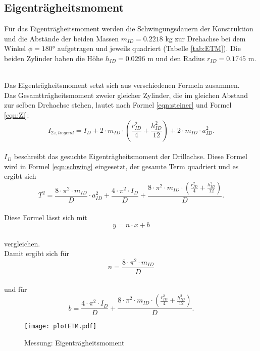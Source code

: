 \subsection{Eigenträgheitsmoment}
Für das Eigenträgheitsmoment werden die Schwingungsdauern der Konstruktion und die Abstände der beiden Massen $m_{ID}=0.2218$ kg zur Drehachse bei dem Winkel $\phi = 180°$ aufgetragen und jeweils quadriert (Tabelle \ref{tab:ETM}).
Die beiden Zylinder haben die Höhe $h_{ID}=0.0296$ m und den Radius $r_{ID}=0.1745$ m.

\\Das Eigenträgheitsmoment setzt sich aus verschiedenen Formeln zusammen.
\\Das Gesamtträgheitsmoment zweier gleicher Zylinder, die im gleichen Abstand zur selben Drehachse stehen, lautet nach Formel \eqref{eqn:steiner} und Formel \eqref{eqn:Zl}:
\begin{equation*}
  I_{2z, liegend} = I_{D} + 2 \cdot m_{ID} \cdot \left(\frac{r_{ID}^2}{4} + \frac{h_{ID}^2}{12} \right) + 2 \cdot m_{ID} \cdot a_{ID}^2.
\end{equation*}
\\$I_{D}$ beschreibt das gesuchte Eigenträgheitsmoment der Drillachse.
Diese Formel wird in Formel \eqref{eqn:schwing} eingesetzt, der gesamte Term quadriert und es ergibt sich
\begin{equation*}
  T^2 = \frac{8 \cdot \pi^2 \cdot m_{ID}}{D} \cdot a_{ID}^2 + \frac{4 \cdot \pi^2 \cdot I_{D}}{D} + \frac{8 \cdot \pi^2 \cdot m_{ID} \cdot \left(\frac{r_{ID}^2}{4} + \frac{h_{ID}^2}{12} \right) }{D}.
\end{equation*}
\\Diese Formel lässt sich mit
\begin{equation*}
  y = n \cdot x + b
\end{equation*}
\\vergleichen.
\\Damit ergibt sich für
\begin{equation*}
  n = \frac{8 \cdot \pi^2 \cdot m_{ID}}{D}
\end{equation*}
\\und für
\begin{equation}
  b = \frac{4 \cdot \pi^2 \cdot I_{D}}{D} + \frac{8 \cdot \pi^2 \cdot m_{ID} \cdot \left( \frac{r_{ID}^2}{4} + \frac{h_{ID}^2}{12} \right) }{D}.
\label{eqn:linb}
\end{equation}
\begin{figure}[h!]
  \centering
  \texttt{[image: plotETM.pdf]}
  \caption{Messung: Eigenträgheitsmoment}
  \label{fig:linreg}
\end{figure}
